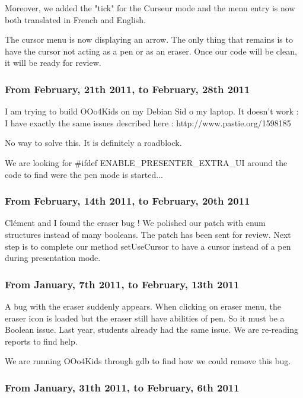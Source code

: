 \documentclass[a4paper,11pt]{article}
\begin{document}
Moreover, we added the "tick" for the Curseur mode and the menu entry is now
both translated in French and English.

The cursor menu is now displaying an arrow. The only thing that remains is to
have the cursor not acting as a pen or as an eraser. Once our code will be
clean, it will be ready for review.

\subsubsection*{From February, 21th 2011, to February, 28th 2011}

I am trying to build OOo4Kids on my Debian Sid o my laptop.  It doesn't work :
I have exactly the same issues described here : http://www.pastie.org/1598185

No way to solve this. It is definitely a roadblock.

We are looking for \#ifdef ENABLE\_PRESENTER\_EXTRA\_UI around the code to
find were the pen mode is started...

\subsubsection*{From February, 14th 2011, to February, 20th 2011}

Clément and I found the eraser bug ! We polished our patch with enum
structures instead of many booleans. The patch has been sent for review. Next
step is to complete our method setUseCursor to have a cursor instead of a pen
during presentation mode.


\subsubsection*{From January, 7th 2011, to February, 13th 2011}

A bug with the eraser suddenly appears. When clicking on eraser menu, the
eraser icon is loaded but the eraser still have abilities of pen. So it must
be a Boolean issue. Last year, students already had the same issue. We are
re-reading reports to find help.

We are running OOo4Kids through gdb to find how we could remove this bug.

\subsubsection*{From January, 31th 2011, to February, 6th 2011}
\end{document}
